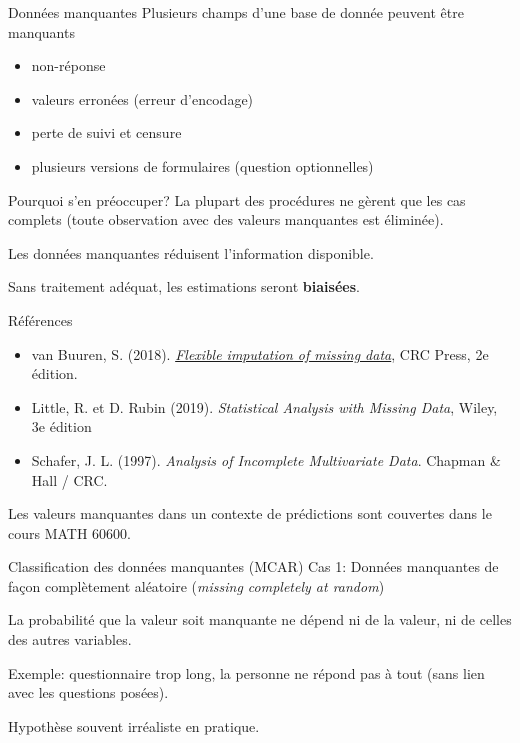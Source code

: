 \documentclass[
  ignorenonframetext,
]{beamer}
\providecommand{\tightlist}{%
  \setlength{\itemsep}{0pt}\setlength{\parskip}{0pt}}\usepackage{longtable,booktabs,array}
\begin{document}
\begin{frame}{Données manquantes}
\protect\hypertarget{donnuxe9es-manquantes}{}
Plusieurs champs d'une base de donnée peuvent être manquants

\begin{itemize}
\tightlist
\item
  non-réponse
\item
  valeurs erronées (erreur d'encodage)
\item
  perte de suivi et censure
\item
  plusieurs versions de formulaires (question optionnelles)
\end{itemize}
\end{frame}

\begin{frame}{Pourquoi s'en préoccuper?}
\protect\hypertarget{pourquoi-sen-pruxe9occuper}{}
La plupart des procédures ne gèrent que les cas complets (toute
observation avec des valeurs manquantes est éliminée).

Les données manquantes réduisent l'information disponible.

Sans traitement adéquat, les estimations seront \textbf{biaisées}.
\end{frame}

\begin{frame}{Références}
\protect\hypertarget{ruxe9fuxe9rences}{}
\begin{itemize}
\tightlist
\item
  van Buuren, S. (2018).
  \href{https://stefvanbuuren.name/fimd/}{\emph{Flexible imputation of
  missing data}}, CRC Press, 2e édition.
\item
  Little, R. et D. Rubin (2019). \emph{Statistical Analysis with Missing
  Data}, Wiley, 3e édition
\item
  Schafer, J. L. (1997). \emph{Analysis of Incomplete Multivariate
  Data}. Chapman \& Hall / CRC.
\end{itemize}

Les valeurs manquantes dans un contexte de prédictions sont couvertes
dans le cours MATH 60600.
\end{frame}

\begin{frame}{Classification des données manquantes (MCAR)}
\protect\hypertarget{classification-des-donnuxe9es-manquantes-mcar}{}
Cas 1: Données manquantes de façon complètement aléatoire (\emph{missing
completely at random})

La probabilité que la valeur soit manquante ne dépend ni de la valeur,
ni de celles des autres variables.

Exemple: questionnaire trop long, la personne ne répond pas à tout (sans
lien avec les questions posées).

Hypothèse souvent irréaliste en pratique.
\end{frame}
\end{document}
